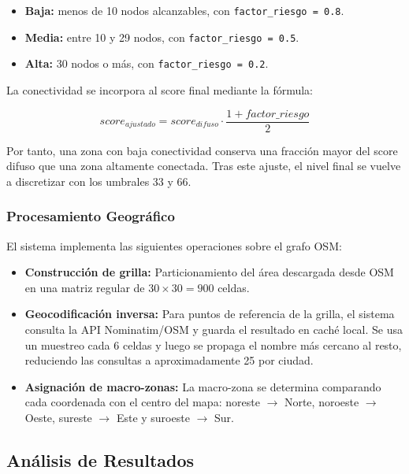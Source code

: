 \documentclass[11pt]{article}
\begin{document}
\begin{itemize}
    \item \textbf{Baja:} menos de 10 nodos alcanzables, con \texttt{factor\_riesgo = 0.8}.
    \item \textbf{Media:} entre 10 y 29 nodos, con \texttt{factor\_riesgo = 0.5}.
    \item \textbf{Alta:} 30 nodos o más, con \texttt{factor\_riesgo = 0.2}.
\end{itemize}

La conectividad se incorpora al score final mediante la fórmula:

\begin{equation}
    score_{ajustado} = score_{difuso} \cdot \frac{1 + factor\_riesgo}{2}
\end{equation}

Por tanto, una zona con baja conectividad conserva una fracción mayor del score difuso que una zona altamente conectada. Tras este ajuste, el nivel final se vuelve a discretizar con los umbrales 33 y 66.

\subsubsection{Procesamiento Geográfico}

El sistema implementa las siguientes operaciones sobre el grafo OSM:

\begin{itemize}
    \item \textbf{Construcción de grilla:} Particionamiento del área descargada desde OSM en una matriz regular de $30 \times 30 = 900$ celdas.
    \item \textbf{Geocodificación inversa:} Para puntos de referencia de la grilla, el sistema consulta la API Nominatim/OSM y guarda el resultado en caché local. Se usa un muestreo cada 6 celdas y luego se propaga el nombre más cercano al resto, reduciendo las consultas a aproximadamente 25 por ciudad.
    \item \textbf{Asignación de macro-zonas:} La macro-zona se determina comparando cada coordenada con el centro del mapa: noreste $\rightarrow$ Norte, noroeste $\rightarrow$ Oeste, sureste $\rightarrow$ Este y suroeste $\rightarrow$ Sur.
\end{itemize}

\subsection{Análisis de Resultados}
\end{document}
